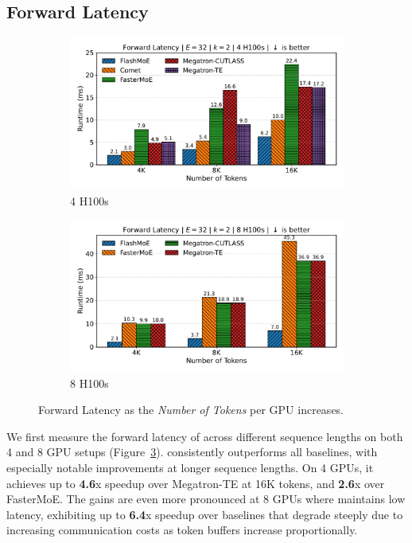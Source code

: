 \subsection{Forward Latency}\label{subsec:forward-latency}
\begin{figure}[!h]
    \centering
    \begin{subfigure}{0.49\textwidth}
        \centering
        \includegraphics[width=\linewidth, keepaspectratio]{flash_figs/scaling_tokens}
        \caption{4 H100s}
        \label{sub:4gl}
    \end{subfigure}
    \begin{subfigure}{0.49\textwidth}
        \centering
        \includegraphics[width=\linewidth, keepaspectratio]{flash_figs/scaling_tokens_8}
        \caption{8 H100s}
        \label{sub:8gl}
    \end{subfigure}
    \caption{Forward Latency as the \emph{Number of Tokens} per GPU increases.}
    \label{fig:fl}
\end{figure}
We first measure the forward latency of \sysname across different sequence lengths on both 4 and 8 GPU setups
(Figure~\ref{fig:fl}).
\sysname consistently outperforms all baselines,
with especially notable improvements at longer sequence lengths.
On 4 GPUs, it achieves up to \textbf{4.6}x speedup over Megatron-TE at 16K tokens,
and \textbf{2.6}x over FasterMoE.
The gains are even more pronounced at 8 GPUs
where \sysname maintains low latency, exhibiting up to \textbf{6.4}x speedup over baselines that
degrade steeply due to increasing communication costs as token buffers increase proportionally.
